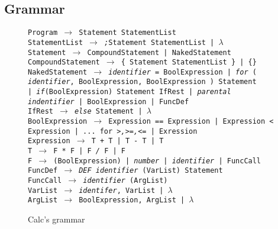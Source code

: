 \documentclass{article}
\begin{document}
\subsection{Grammar}
\begin{figure}[H]
\texttt
{Program $\rightarrow$ Statement StatementList \\
StatementList $\rightarrow$ \textit{;}Statement StatementList | $\lambda$ \\
Statement $\rightarrow$ CompoundStatement | NakedStatement \\
CompoundStatement $\rightarrow$  \{ Statement StatementList \} | \{\} \\
NakedStatement $\rightarrow$ \textit{identifier} = BoolExpression 
| \textit{for} ( \textit{identifier}, BoolExpression, BoolExpression ) Statement \\
| \textit{if}(BoolExpression) Statement IfRest | \textit{parental} \textit{indentifier} | BoolExpression | FuncDef\\
IfRest  $\rightarrow$ \textit{else} Statement | $\lambda$ \\
BoolExpression $\rightarrow$ Expression \textit{==} Expression | Expression \textit{<} Expression | ... for \textit{>,>=,<=} | Exression \\
Expression $\rightarrow$ T \textit{+} T | T \textit{-} T | T \\
T $\rightarrow$ F \textit{*} F | F \textit{/} F | F \\
F $\rightarrow$ (BoolExpression) | \textit{number} | \textit{identifier} | FuncCall \\
FuncDef $\rightarrow$ \textit{DEF} \textit{identifier} (VarList) Statement \\
FuncCall $\rightarrow$ \textit{identifier} (ArgList) \\
VarList $\rightarrow$ \textit{identifer}, VarList | $\lambda$ \\
ArgList $\rightarrow$ BoolExpression, ArgList | $\lambda$ \\}
	\caption{Calc's grammar \label{fig:grammar}}
\end{figure}
\end{document}
